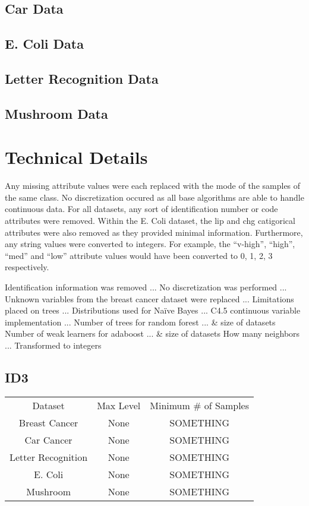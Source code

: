 \documentclass[11pt]{article}
\begin{document}
\subsection{Car Data}
\subsection{E. Coli Data}
\subsection{Letter Recognition Data}
\subsection{Mushroom Data}

\section{Technical Details}
Any missing attribute values were each replaced with the mode of the samples of the same class. No discretization occured as all base algorithms are able to handle continuous data. For all datasets, any sort of identification number or code attributes were removed. Within the E. Coli dataset, the lip and chg catigorical attributes were also removed as they provided minimal information. Furthermore, any string values were converted to integers. For example, the ``v-high'', ``high'', ``med'' and ``low'' attribute values would have been converted to 0, 1, 2, 3 respectively.


Identification information was removed ...
No discretization was performed ...
Unknown variables from the breast cancer dataset were replaced ...
Limitations placed on trees ...
Distributions used for Naïve Bayes ...
C4.5 continuous variable implementation ...
Number of trees for random forest ... & size of datasets
Number of weak learners for adaboost ... & size of datasets
How many neighbors ...
Transformed to integers

\subsection{ID3}
\begin{tabular}{ |c|c|c| }
  Dataset            & Max Level & Minimum # of Samples \\
  Breast Cancer      & None      & SOMETHING            \\
  Car Cancer         & None      & SOMETHING            \\
  Letter Recognition & None      & SOMETHING            \\
  E. Coli            & None      & SOMETHING            \\
  Mushroom           & None      & SOMETHING
\end{tabular}
\end{document}
